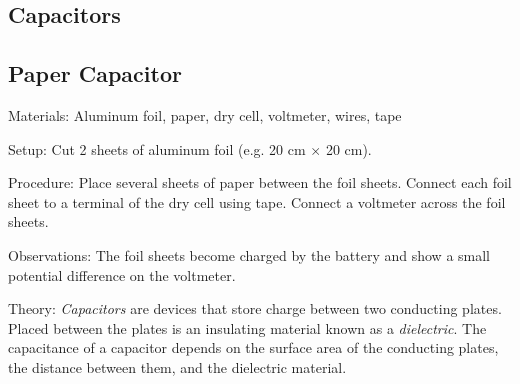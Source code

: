 \begin{multicols}{2}
\columnbreak


\section*{Capacitors} 


\subsection{Paper Capacitor}


\begin{description*}
\item[Materials:]{Aluminum foil, paper, dry cell, voltmeter, wires, tape}
\item[Setup:]{Cut 2 sheets of aluminum foil (e.g. 20 cm $\times$ 20 cm).}
\item[Procedure:]{Place several sheets of paper between the foil sheets. Connect each foil sheet to a terminal of the dry cell using tape. Connect a voltmeter across the foil sheets.}
\item[Observations:]{The foil sheets become charged by the battery and show a small potential difference on the voltmeter.}
\item[Theory:]{\emph{Capacitors} are devices that store charge between two conducting plates. Placed between the plates is an insulating material known as a \emph{dielectric}. The capacitance of a capacitor depends on the surface area of the conducting plates, the distance between them, and the dielectric material.}
\end{description*}


\end{multicols}

\pagebreak